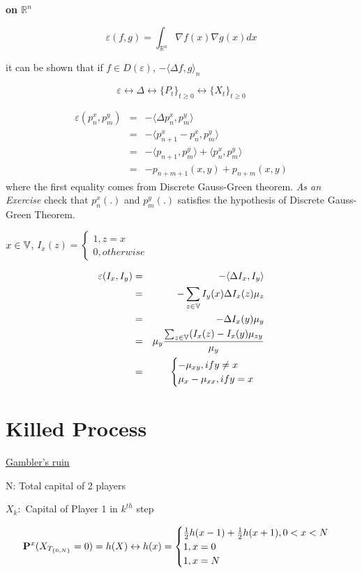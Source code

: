 \documentclass[main]{subfiles}
\begin{document}
\textbf{on $\mathbb{R}^n$}

$$\varepsilon (f,g)= \int_{\mathbb{R}^n} \nabla f(x) \nabla g(x) dx$$

it can be shown that if $f \in D(\varepsilon)$, $-\langle \Delta f, g \rangle_n$

$$\varepsilon \leftrightarrow \Delta \leftrightarrow \{P_t\}_{t \geq 0} \leftrightarrow \{X_t\}_{t \geq 0}$$

\begin{eqnarray*}
     \varepsilon(p_n^x, p_m^y)&=&-\langle  \Delta p_n^x, p_m^y \rangle  \\
     &=& -\langle p_{n+1}^x-p_n^x, p_m^y \rangle \\
     &=& -\langle p_{n+1}, p_m^y \rangle + \langle p_n^x, p_m^y \rangle \\
     &=& -p_{n+m+1}(x,y)+p_{n+m}(x,y)
\end{eqnarray*}
where the first equality comes from Discrete Gauss-Green theorem. \textit{As an Exercise} check that $p_n^x(.)$ and $p_m^y(.)$ satisfies the hypothesis of Discrete Gauss- Green Theorem.

$x \in  \V$,
$I_x(z)=
     \begin{cases}
          1, z=x \\
          0, otherwise
     \end{cases}$

\begin{eqnarray*}
     \varepsilon(I_x, I_y) &=& - \langle \Delta I_x, I_y \rangle \\
     &=& - \sum_{z \in \V} I_y(x)\Delta I_x(z) \mu_z \\
     &=& -\Delta I_x(y) \mu_y \\
     &=& \mu_y \frac{\sum_{z \in \V}(I_x(z)-I_x(y)\mu_{zy}}{\mu_y} \\
     &=&
     \begin{cases}
          -\mu_{xy}, if y \neq x \\
          \mu_x - \mu_{xx}, if y=x
     \end{cases}
\end{eqnarray*}
\section{Killed Process}
\underline{Gambler's ruin}

N: Total capital of 2 players

$X_k:$ Capital of Player 1 in $k^{th}$ step

$$\P^x(X_{T_{\{0,N\}}}=0)=h(X)\leftrightarrow h(x)=
     \begin{cases}
          \frac{1}{2}h(x-1)+\frac{1}{2}h(x+1), 0<x<N \\
          1, x=0                                     \\
          1, x=N
     \end{cases}$$
\end{document}
